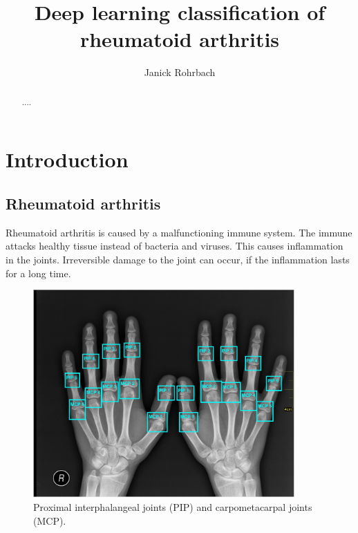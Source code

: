 \documentclass[11pt]{article}
\begin{document}
\title{Deep learning classification of rheumatoid arthritis}
\author{Janick Rohrbach}
\maketitle

\newpage
	
\begin{abstract}
....
\end{abstract}

\newpage

\section{Introduction}
\label{sec:intro}


\subsection{Rheumatoid arthritis}
\label{subsec:rheuma}

Rheumatoid arthritis is caused by a malfunctioning immune system. The immune attacks healthy tissue instead of bacteria and viruses. This causes inflammation in the joints. Irreversible damage to the joint can occur, if the inflammation lasts for a long time. \cite{rheuma}


\begin{figure}
\includegraphics[width=10cm]{labels}	
\caption{Proximal interphalangeal joints (PIP) and carpometacarpal joints (MCP).}
\label{fig:labels}
\end{figure}
\end{document}
